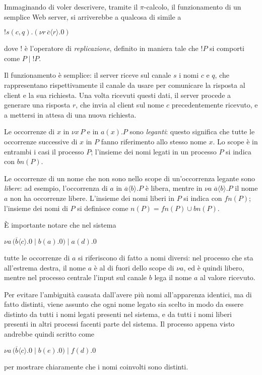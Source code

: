 Immaginando di voler descrivere, tramite il $\pi$-calcolo, il funzionamento
di un semplice Web server, si arriverebbe a qualcosa di simile a

\begin{pilisting}
$
    !s(c,q).(\nu r \, \overline{c}\langle r\rangle.0)
$
\end{pilisting}

dove $!$ \`e l'operatore di \emph{replicazione}, definito in maniera tale
che $!P$ si comporti come $P \; | \; !P$.

Il funzionamento \`e semplice: il server riceve sul canale $s$ i nomi $c$ e
$q$, che rappresentano rispettivamente il canale da usare per comunicare la
risposta al client e la sua richiesta. Una volta ricevuti questi dati, il
server procede a generare una risposta $r$, che invia al client sul nome $c$
precedentemente ricevuto, e a mettersi in attesa di una nuova richiesta.

Le occorrenze di $x$ in $\nu x \, P$ e in $ a(x).P$ sono \emph{leganti}:
questo significa che tutte le occorrenze successive di $x$ in $P$ fanno
riferimento allo stesso nome $x$. Lo scope \`e in entrambi i casi il
processo $P$; l'insieme dei nomi legati in un processo $P$ si indica con
$bn(P)$.

Le occorrenze di un nome che non sono nello scope di un'occorrenza legante
sono \emph{libere}: ad esempio, l'occorrenza di $a$ in
$\overline{a}\langle b\rangle.P$ \`e libera, mentre in
$\nu a \; \overline{a}\langle b\rangle.P$ il nome $a$ non ha occorrenze
libere. L'insieme dei nomi liberi in $P$ si indica con $fn(P)$; l'insieme
dei nomi di $P$ si definisce come $n(P) = fn(P) \cup bn(P)$.

\`E importante notare che nel sistema

\begin{pilisting}
$
    \nu a \, (
      \overline{b}\langle c\rangle.0 \; | \;
      b(a).0
    ) \; | \;
    a(d).0
$
\end{pilisting}

tutte le occorrenze di $a$ si riferiscono di fatto a nomi diversi: nel
processo che sta all'estrema destra, il nome $a$ \`e al di fuori dello
scope di $\nu a$, ed \`e quindi libero, mentre nel processo centrale
l'input sul canale $b$ lega il nome $a$ al valore ricevuto.

Per evitare l'ambiguit\`a causata dall'avere pi\`u nomi all'apparenza
identici, ma di fatto distinti, viene assunto che ogni nome legato sia
scelto in modo da essere distinto da tutti i nomi legati presenti nel
sistema, e da tutti i nomi liberi presenti in altri processi facenti parte
del sistema. Il processo appena visto andrebbe quindi scritto come

\begin{pilisting}
$
    \nu a \, (
      \overline{b}\langle c\rangle.0 \; | \;
      b(e).0
    ) \; | \;
    f(d).0
$
\end{pilisting}

per mostrare chiaramente che i nomi coinvolti sono distinti.

